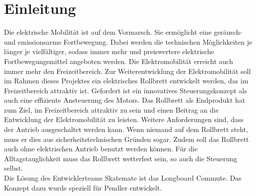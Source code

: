 \chapter{Einleitung}
Die elektrische Mobilität ist auf dem Vormarsch. Sie ermöglicht eine geräusch- und emissionsarme Fortbewegung. Dabei werden die technischen Möglichkeiten je länger je vielfältiger, sodass immer mehr und preiswertere elektrische Fortbewegungsmittel angeboten werden.
Die Elektromobilität erreicht auch immer mehr den Freizeitbereich.
Zur Weiterentwicklung der Elektromobilität soll im Rahmen dieses Projektes ein elektrisches Rollbrett entwickelt werden, das im Freizeitbereich attraktiv ist.
Gefordert ist ein innovatives Steuerungskonzept als auch eine effiziente Ansteuerung des Motors. Das Rollbrett als Endprodukt hat zum Ziel, im Freizeitbereich attraktiv zu sein und einen Beitrag an die Entwicklung der Elektromobilität zu leisten. Weitere Anforderungen sind, dass der Antrieb ausgeschaltet werden kann. Wenn niemand auf dem Rollbrett steht, muss er dies aus sicherheitstechnischen Gründen sogar. Zudem soll das Rollbrett auch ohne elektrischen Antrieb benutzt werden können. Für die Alltagstauglichkeit muss das Rollbrett wetterfest sein, so auch die Steuerung selbst.\\

Die Lösung des Entwicklerteams Skatemate ist das Longboard Commute. Das Konzept dazu wurde speziell für Pendler entwickelt. 

